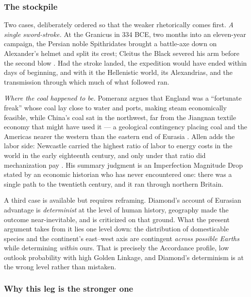 \subsubsection{The stockpile}\label{gc:subsub:stockpile}

Two cases, deliberately ordered so that the weaker rhetorically comes
first. \emph{A single sword-stroke.} At the Granicus in 334 BCE, two months
into an eleven-year campaign, the Persian noble Spithridates brought a
battle-axe down on Alexander's helmet and split its crest; Cleitus the
Black severed his arm before the second blow \cite{Arrian,PlutarchAlex}. Had the stroke landed, the expedition would have ended
within days of beginning, and with it the Hellenistic world, its
Alexandrias, and the transmission through which much of what followed
ran.

\emph{Where the coal happened to be.} Pomeranz argues that England was
a ``fortunate freak'' whose coal lay close to water and ports, making
steam economically feasible, while China's coal sat in the northwest,
far from the Jiangnan textile economy that might have used it ---
a geological contingency placing coal and the Americas nearer the
western than the eastern end of Eurasia \cite{Pomeranz00}. Allen adds
the labor side: Newcastle carried the highest ratio of labor to energy
costs in the world in the early eighteenth century, and only under that
ratio did mechanization pay \cite{Allen09}. His summary judgment is
an Imperfection Magnitude Drop stated by an economic historian who has
never encountered one: there was a single path to the twentieth century,
and it ran through northern Britain.

A third case is available but requires reframing. Diamond's account of
Eurasian advantage \cite{Diamond97} is \emph{determinist} at the level
of human history, geography made the outcome near-inevitable, and
is criticized on that ground. What the present argument takes from it
lies one level down: the distribution of domesticable species and the
continent's east--west axis are contingent \emph{across possible
Earths} while determining \emph{within} ours. That is precisely the
Accordance profile, low outlook probability with high Golden Linkage,
and Diamond's determinism is at the wrong level rather than mistaken.

\subsubsection{Why this leg is the stronger one}
\label{gc:subsub:strongerleg}

